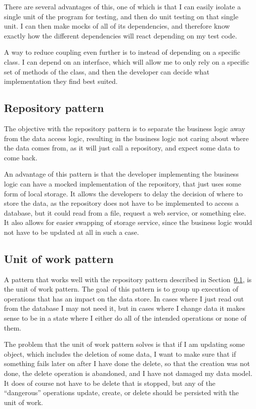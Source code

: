 There are several advantages of this, one of which is that I can easily isolate
a single unit of the program for testing, and then do unit testing on that
single unit. I can then make mocks of all of its dependencies, and therefore
know exactly how the different dependencies will react depending on my test
code\cite{dependency_injection}. 

A way to reduce coupling even further is to instead of depending on a specific
class. I can depend on an interface, which will allow me to only rely on a
specific set of methods of the class, and then the developer can decide what
implementation they find best suited. 

\subsection{Repository pattern}
\label{sub:repository_pattern}
The objective with the repository pattern is to separate the business logic away
from the data access logic, resulting in the business logic not caring about
where the data comes from, as it will just call a repository, and expect some
data to come back. 

An advantage of this pattern is that the developer implementing the business
logic can have a mocked implementation of the repository, that just uses some
form of local storage. It allows the developers to delay the decision of where
to store the data, as the repository does not have to be implemented to access a
database, but it could read from a file, request a web service, or something
else\cite{repository_pattern}. It also allows for easier swapping of storage
service, since the business logic would not have to be updated at all in such a case. 

\subsection{Unit of work pattern}
\label{sub:unit_of_work_pattern}
A pattern that works well with the repository pattern  described in
Section~\ref{sub:repository_pattern}, is the unit of work pattern. The goal of
this pattern is to group up execution of operations that has an impact on the
data store. In cases where I just read out from the database I may not need it,
but in cases where I change data it makes sense to be in a state where I either
do all of the intended operations or none of them. 

The problem that the unit of work pattern solves is that if I am updating some
object, which includes the deletion of some data, I want to make sure that if
something fails later on after I have done the delete, so that the creation was
not done, the delete operation is abandoned, and I have not damaged my data
model\cite{uow}. It does of course not have to be  delete that is stopped, but
any of the ``dangerous'' operations update, create, or delete should be persisted
with the unit of work.

